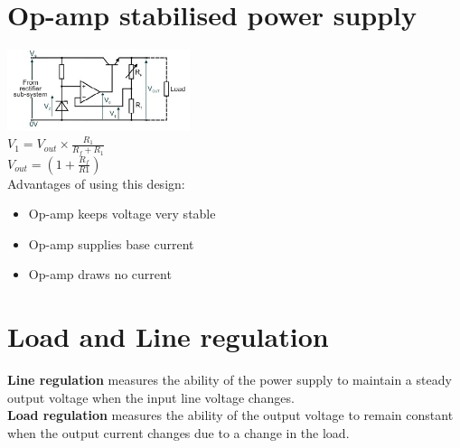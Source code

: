 \documentclass[a4paper, 11pt, twocolumn]{article}
\begin{document}
    \section{Op-amp stabilised power supply}
    \includegraphics[width=0.4\textwidth]{opampStabilised.jpg} \\
    $\displaystyle V_1 = V_{out} \times \frac{R_1}{R_f + R_1}$ \\
    $\displaystyle V_{out} = (1+\frac{R_f}{R1})$ \\
    Advantages of using this design:
    \begin{itemize}
        \item Op-amp keeps voltage very stable
        \item Op-amp supplies base current
        \item Op-amp draws no current
    \end{itemize}

    \section{Load and Line regulation}
    \textbf{Line regulation }measures the ability of the power supply to maintain a steady output voltage when the input line voltage changes. \\
    \textbf{Load regulation }measures the ability of the output voltage to remain constant when the output current changes due to a change in the load.
\end{document}
